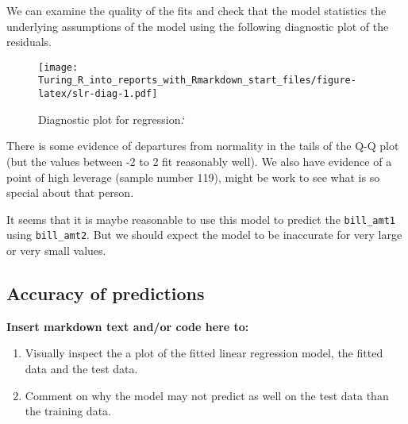 \documentclass[
]{article}
\providecommand{\tightlist}{%
  \setlength{\itemsep}{0pt}\setlength{\parskip}{0pt}}
\begin{document}
We can examine the quality of the fits and check that the model
statistics the underlying assumptions of the model using the following
diagnostic plot of the residuals.

\begin{figure}
\centering
\texttt{[image: Turing\_R\_into\_reports\_with\_Rmarkdown\_start\_files/figure-latex/slr-diag-1.pdf]}
\caption{Diagnostic plot for regression.`}
\end{figure}

There is some evidence of departures from normality in the tails of the
Q-Q plot (but the values between -2 to 2 fit reasonably well). We also
have evidence of a point of high leverage (sample number 119), might be
work to see what is so special about that person.

It seems that it is maybe reasonable to use this model to predict the
\texttt{bill\_amt1} using \texttt{bill\_amt2}. But we should expect the
model to be inaccurate for very large or very small values.

\newpage

\hypertarget{accuracy-of-predictions}{%
\subsection{Accuracy of predictions}\label{accuracy-of-predictions}}

\textbf{Insert markdown text and/or code here to:}

\begin{enumerate}
\def\labelenumi{\arabic{enumi}.}
\tightlist
\item
  Visually inspect the a plot of the fitted linear regression model, the
  fitted data and the test data.\\
\item
  Comment on why the model may not predict as well on the test data than
  the training data.
\end{enumerate}
\end{document}

